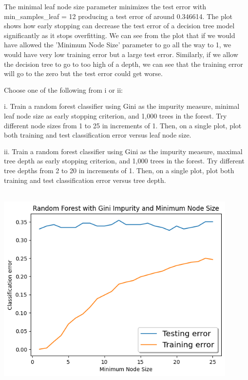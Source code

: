 \begin{solution}
   The minimal leaf node size parameter minimizes the test error with min_samples_leaf = 12 producing a test error of around 0.346614. The plot shows how early stopping can decrease the test error of a decision tree model significantly as it stops overfitting. We can see from the plot that if we would have allowed the 'Minimum Node Size' parameter to go all the way to 1, we would have very low training error but a large test error. Similarly, if we allow the decision tree to go to too high of a depth, we can see that the training error will go to the zero but the test error could get worse.
\end{solution}

\indent\problem[4] Choose one of the following from i or ii: \smallskip 

\noindent i. Train a random forest classifier using Gini as the impurity measure, minimal leaf node size as early stopping criterion, and 1,000 trees in the forest. Try different node sizes from 1 to 25 in increments of 1. Then, on a single plot, plot both training and test classification error versus
leaf node size.

ii. Train a random forest classifier using Gini as the impurity measure, maximal tree depth as early stopping criterion, and 1,000 trees in the forest. Try different tree depths from 2 to 20 in increments of 1. Then, on a single plot, plot both training and test classification error versus tree depth.

\begin{solution}
    \\
    \includegraphics[width=12cm]{images/P2_C_i.png} \\
\end{solution}

